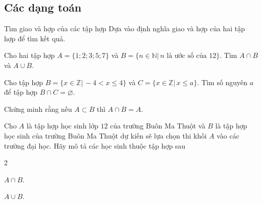 \subsection{Các dạng toán}
\begin{dang}{Tìm giao và hợp của các tập hợp}
	Dựa vào định nghĩa giao và hợp của hai tập hợp để tìm kết quả.
\end{dang}
\begin{vd}%
	Cho hai tập hợp $A=\{1;2;3;5;7\}$ và  $B=\{n\in \mathbb{N} |\, n \text{ là ước số của } 12\}$. Tìm $A\cap B$  và $A\cup B$.
\end{vd}

\begin{vd}%
	Cho tập hợp $B=\{ x\in \mathbb{Z}|\, -4< x \le 4 \}$ và $C=\{ x\in \mathbb{Z}|\, x\le a\}$.
	Tìm số nguyên $a$ để tập hợp $B\cap C=\varnothing $.
\end{vd}

\begin{vd}%
	Chứng minh rằng nếu $A\subset B$ thì $A\cap B=A$.
\end{vd}

\begin{vd}%
	Cho $A$ là tập hợp học sinh lớp $12$ của trường Buôn Ma Thuột và $B$ là tập hợp học sinh của trường Buôn Ma Thuột dự kiến sẽ lựa chọn thi khối $A$ vào các trường đại học. Hãy mô tả các học sinh thuộc tập hợp sau
	\begin{enumerate}[a)]
	\end{enumerate}
\end{vd}


